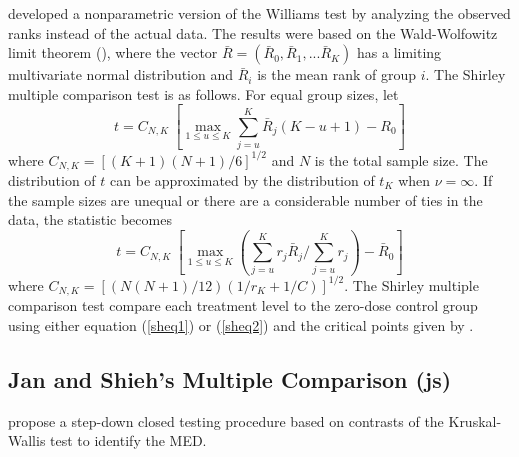\citep{Shirley} developed a nonparametric version of the Williams test by analyzing the observed ranks instead of the actual data. The results were based on the Wald-Wolfowitz  limit theorem (\cite{wald_1944}), where the vector $\bar{R}=\left(\bar{R}_0, \bar{R}_1, ...\bar{R}_K\right)$ has a limiting multivariate normal distribution and $\bar{R}_i$ is the mean rank of group $i$. The Shirley multiple comparison test is as follows. For equal group sizes, let 
\begin{equation} \label{sheq1}
t = C_{N,K} ~ \left[\underset{1 \leq u \leq K}{\max} \sum_{j=u}^{K} \bar{R}_j (K-u+1)-R_0\right]
\end{equation}
where $C_{N,K} = \left[(K+1)(N+1)/6\right]^{1/2}$ and $N$ is the total sample size. The distribution of $t$ can be approximated by the distribution of $t_K$ when $\nu = \infty$. If the sample sizes are unequal or there are  a considerable number of ties in the data, the statistic becomes
\begin{equation} \label{sheq2}
t = C_{N,K} ~ \left[\underset{1 \leq u \leq K}{\max} \left( \sum_{j=u}^{K} r_j \bar{R}_j /\sum_{j=u}^{K} r_j \right) - \bar{R}_0 \right] 
\end{equation}
where $C_{N,K} = [(N(N+1)/12)(1/r_K + 1/C)]^{1/2}.$ The Shirley multiple comparison test compare each treatment level to the zero-dose control group using either equation (\ref{sheq1}) or (\ref{sheq2}) and the critical points given by \cite{Williams}.

%
\subsection{Jan and Shieh's Multiple Comparison (js)}\label{js}


\cite{jan_shieh} propose a step-down closed testing procedure based on contrasts of the Kruskal-Wallis test to identify the MED. 

